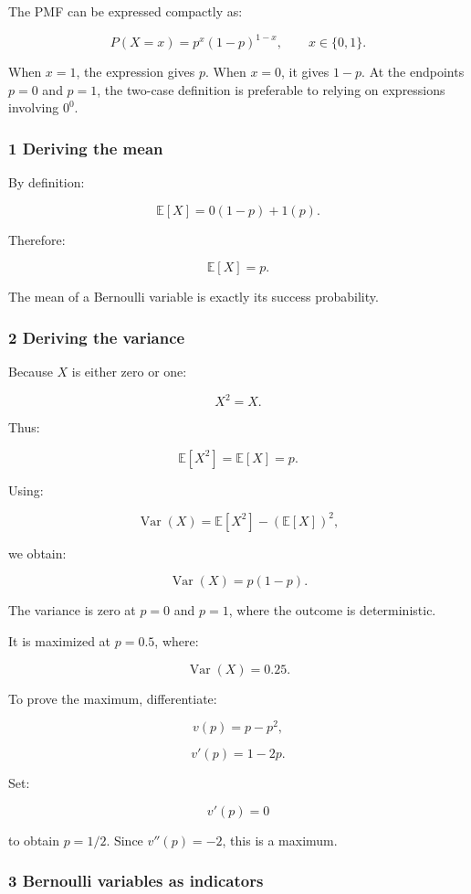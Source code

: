 The PMF can be expressed compactly as:

\[
 \boxed{ P(X=x)=p^x(1-p)^{1-x}, \qquad x\in\{0,1\} }.
\]

When \(x=1\), the expression gives \(p\). When \(x=0\), it gives \(1-p\). At the endpoints \(p=0\) and \(p=1\), the two-case definition is preferable to relying on expressions involving \(0^0\).

\subsubsection{1 Deriving the mean}\label{02-foundations-ii-ch023-deriving-the-mean}

By definition:

\[
 \mathbb E[X] = 0(1-p)+1(p).
\]

Therefore:

\[
 \boxed{\mathbb E[X]=p}.
\]

The mean of a Bernoulli variable is exactly its success probability.

\subsubsection{2 Deriving the variance}\label{02-foundations-ii-ch023-deriving-the-variance}

Because \(X\) is either zero or one:

\[
 X^2=X.
\]

Thus:

\[
 \mathbb E[X^2]=\mathbb E[X]=p.
\]

Using:

\[
 \operatorname{Var}(X)= \mathbb E[X^2]-(\mathbb E[X])^2,
\]

we obtain:

\[
 \boxed{ \operatorname{Var}(X)=p(1-p) }.
\]

The variance is zero at \(p=0\) and \(p=1\), where the outcome is deterministic.

It is maximized at \(p=0.5\), where:

\[
 \operatorname{Var}(X)=0.25.
\]

To prove the maximum, differentiate:

\[
 v(p)=p-p^2,
\]

\[
 v'(p)=1-2p.
\]

Set:

\[
 v'(p)=0
\]

to obtain \(p=1/2\). Since \(v''(p)=-2\), this is a maximum.

\subsubsection{3 Bernoulli variables as indicators}\label{02-foundations-ii-ch023-bernoulli-variables-as-indicators}

